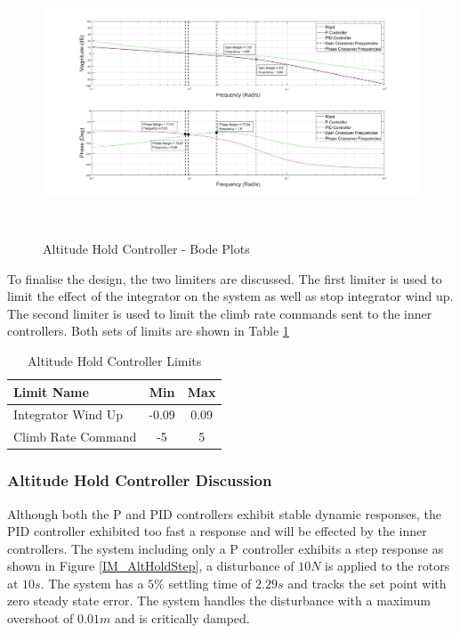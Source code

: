 \documentclass[12pt]{report}
\begin{document}
	\begin{figure}[H]
		\centering
		\includegraphics[height = 8cm]{../Design/Matlab/Controllers/altitude_bode.jpg}
		\caption{Altitude Hold Controller -  Bode Plots}
		\label{IM_AltHoldBode}
	\end{figure}
	
	To finalise the design, the two limiters are discussed. The first limiter is used to limit the effect of the integrator on the system as well as stop integrator wind up. The second limiter is used to limit the climb rate commands sent to the inner controllers. Both sets of limits are shown in Table \ref{tab:AltitudeControllerLimits}
	
	\begin{table}[!]
		\centering
		\begin{tabular}{l | c | c |}
			Limit Name 						& Min & Max\\
			\hline\hline
			Integrator Wind Up 				& -0.09 & 0.09 \\
			Climb Rate Command 		    	& -5 & 5 \\
		\end{tabular}
		\caption{Altitude Hold Controller Limits}
		\label{tab:AltitudeControllerLimits}
	\end{table}
	
	\subsubsection{Altitude Hold Controller Discussion}
	Although both the P and PID controllers exhibit stable dynamic responses, the PID controller exhibited too fast a response and will be effected by the inner controllers. The system including only a P controller exhibits a step response as shown in Figure \ref{IM_AltHoldStep}, a disturbance of $10N$ is applied to the rotors at $10s$. The system has a $5\%$ settling time of $2.29s$ and tracks the set point with zero steady state error. The system handles the disturbance with a maximum overshoot of $0.01m$ and is critically damped.
	
\end{document}
